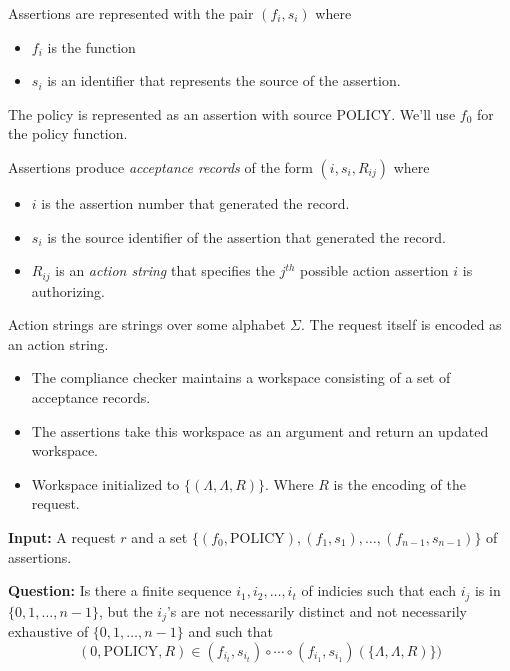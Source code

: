 \documentclass[landscape]{slides}
\begin{document}

Assertions are represented with the pair $(f_i, s_i)$ where
\begin{itemize}
  \item $f_i$ is the function
  \item $s_i$ is an identifier that represents the source of the assertion.
\end{itemize}

The policy is represented as an assertion with source POLICY. We'll use $f_0$ for the policy function.

\stopslide


Assertions produce \textit{acceptance records} of the form $(i, s_i, R_{ij})$ where

\begin{itemize}
\item $i$ is the assertion number that generated the record.
\item $s_i$ is the source identifier of the assertion that generated the record.
\item $R_{ij}$ is an \textit{action string} that specifies the $j^{th}$ possible action assertion $i$ is authorizing.
\end{itemize}

Action strings are strings over some alphabet $\Sigma$. The request itself is encoded as an action string.

\stopslide


\begin{itemize}
\item The compliance checker maintains a workspace consisting of a set of acceptance records.
\item The assertions take this workspace as an argument and return an updated workspace.
\item Workspace initialized to $\{(\Lambda, \Lambda, R)\}$. Where $R$ is the encoding of the request.
\end{itemize}

\stopslide


\textbf{Input:} A request $r$ and a set $\{(f_0, \mbox{POLICY}), (f_1, s_1), \ldots, (f_{n-1}, s_{n-1})\}$ of assertions.

\textbf{Question:} Is there a finite sequence $i_1, i_2, \ldots, i_t$ of indicies such that each $i_j$ is in $\{0, 1, \ldots, n-1\}$, but the $i_j$'s are not necessarily distinct and not necessarily exhaustive of $\{0, 1, \ldots, n-1\}$ and such that
\begin{displaymath}
  (0, \mbox{POLICY}, R) \in (f_{i_t}, s_{i_t}) \circ \cdots \circ (f_{i_1}, s_{i_1})(\{\Lambda, \Lambda, R)\})
\end{displaymath}
\end{document}
